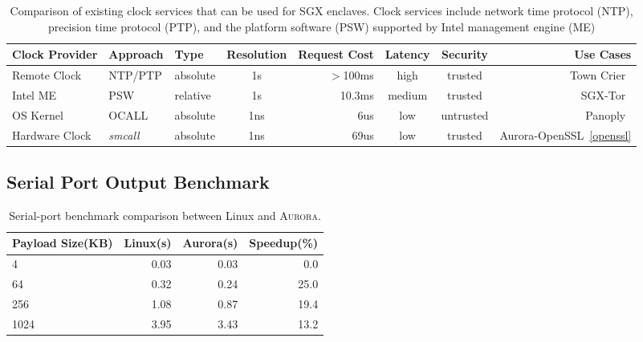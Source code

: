 \begin{table}[t]
	\centering
	\caption{Comparison of existing clock services that can be used for SGX enclaves. Clock services include network time protocol (NTP), precision time protocol (PTP), and the platform software (PSW) supported by Intel management engine (ME)}
	\label{table:timeservice}
	\small
	\begin{tabular}{lllcrccr}
		\toprule
		\textbf{Clock Provider} & \textbf{Approach} & \textbf{Type} & \textbf{Resolution} & \textbf{Request Cost} & \textbf{Latency} & \textbf{Security} & \textbf{Use Cases} \\
		\midrule
		Remote Clock & NTP/PTP & absolute & 1s & $>$100ms & high & trusted & Town Crier~\cite{DBLP:conf/ccs/ZhangCCJS16} \\
		Intel ME & PSW & relative & 1s & 10.3ms & medium & trusted & SGX-Tor~\cite{DBLP:conf/nsdi/KimHHKH17} \\
		OS Kernel & OCALL & absolute & 1ns & 6us & low & untrusted & Panoply~\cite{shinde_panoply:_2017} \\
		Hardware Clock & \textit{smcall} & absolute & 1ns & 69us & low & trusted & Aurora-OpenSSL~\ref{openssl} \\
		\bottomrule
	\end{tabular}
\end{table}

\subsection{Serial Port Output Benchmark}

\begin{table}[t]
	\centering
	\caption{Serial-port benchmark comparison between Linux and \textsc{Aurora}.}
	\label{table:serial}
	\small
	\begin{tabular}{lrrr}
		\toprule
		\textbf{Payload Size(KB)} & \textbf{Linux(s)} & \textbf{Aurora(s)} & \textbf{Speedup(\%)} \\
		\midrule
		4 & 0.03 & 0.03 & 0.0 \\
		64 & 0.32 & 0.24 & 25.0 \\
		256 & 1.08 & 0.87 & 19.4 \\
		1024 & 3.95 & 3.43 & 13.2 \\
		\bottomrule
	\end{tabular}
\end{table}


